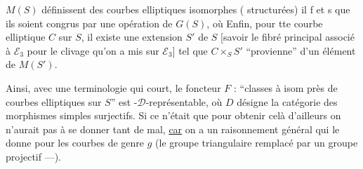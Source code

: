 $M(S)$ définissent des courbes elliptiques isomorphes ( structurées) il f et s que  ils soient congrus par une opération de $G(S)$, où  Enfin, pour tte courbe elliptique $C$ sur $S$, il existe une extension   $S'$ de $S$ [savoir le fibré principal associé à $\mathcal E_3$ pour le clivage qu'on a mis sur $\mathcal E_3$] tel que  $C\times_S S'$ ``provienne'' d'un élément de $M(S')$.

Ainsi, avec une terminologie qui court, le foncteur $F$ : ``classes à isom près de courbes elliptiques sur $S$'' est -$\mathcal D$-représentable, où $D$ désigne la catégorie des morphismes simples surjectifs. Si ce n'était que pour obtenir celà d'ailleurs on n'aurait pas à se donner tant de mal, \uline{car}  on a un raisonnement général qui le donne pour les courbes de genre $g$  (le groupe triangulaire remplacé par un groupe projectif ---).
